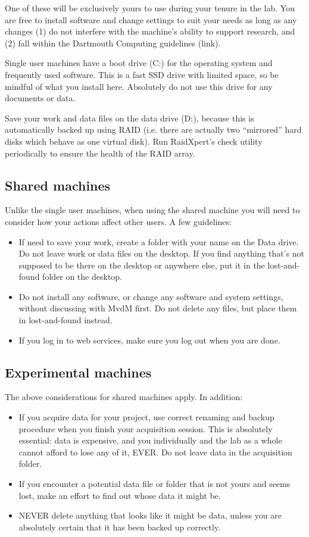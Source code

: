 \documentclass{tufte-book}
\begin{document}
One of these will be exclusively yours to use during your tenure in
the lab. You are free to install software and change settings to suit
your needs as long as any changes (1) do not interfere with the
machine's ability to support research, and (2) fall within the
Dartmouth Computing guidelines (link).

Single user machines have a boot drive (C:) for the operating system
and frequently used software. This is a fast SSD drive with limited
space, so be mindful of what you install here. Absolutely do not use
this drive for any documents or data.

Save your work and data files on the data drive (D:), because this is
automatically backed up using RAID (i.e. there are actually two
``mirrored'' hard disks which behave as one virtual disk). Run
RaidXpert's check utility periodically to ensure the health of the
RAID array.

\subsection{Shared machines}

Unlike the single user machines, when using the shared machine you
will need to consider how your actions affect other users. A few
guidelines:

\begin{itemize}
\item{If need to save your work, create a folder with your name on the Data
drive. Do not leave work or data files on the desktop. If you find
anything that's not supposed to be there on the desktop or anywhere
else, put it in the lost-and-found folder on the desktop.}
\item{Do not install any software, or change any software and system
settings, without discussing with MvdM first. Do not delete any files,
but place them in lost-and-found instead.}
\item{If you log in to web services, make sure you log out when you are
done.}
\end{itemize}

\subsection{Experimental machines}

The above considerations for shared machines apply. In addition:

\begin{itemize}
\item{If you acquire data for your project, use correct renaming and backup
procedure when you finish your acquisition session. This is absolutely
essential: data is expensive, and you individually and the lab as a
whole cannot afford to lose any of it, EVER. Do not leave data in the
acquisition folder.}
\item{If you encounter a potential data file or folder that is not yours
and seems lost, make an effort to find out whose data it might be.}
\item{NEVER delete anything that looks like it might be data, unless you are absolutely certain that it has been backed up correctly.}
\end{itemize}
\end{document}
